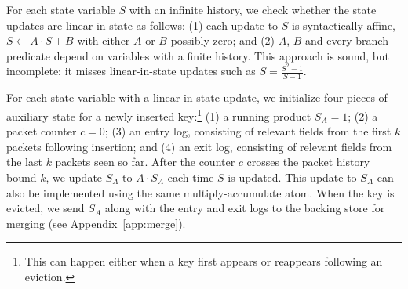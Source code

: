 %

 For each
state variable $S$ with an infinite history, we check whether the state updates
are linear-in-state as follows: (1) each update to $S$ is syntactically affine,
\ie $S \gets A \cdot S + B$ with either $A$ or $B$ possibly zero; and (2) $A$,
$B$ and every branch predicate depend on variables with a finite history. This
approach is sound, but incomplete: it misses linear-in-state updates such as $S
= \frac{S^2 - 1}{S - 1}$.

 For each state variable with a
linear-in-state update, we initialize four pieces of auxiliary state for a
newly inserted key:\footnote{This can happen either when a key first appears or
reappears following an eviction.} (1) a running product $S_A = 1$; (2) a packet
counter $c = 0$; (3) an entry log, consisting of relevant fields from the first
$k$ packets following insertion; and (4) an exit log, consisting of relevant
fields from the last $k$ packets seen so far.  After the counter $c$ crosses
the packet history bound $k$, we update $S_A$ to $A \cdot S_A$ each time $S$ is
updated. This update to $S_A$ can also be implemented using the same
multiply-accumulate atom. When the key is evicted, we send $S_A$ along with the
entry and exit logs to the backing store for merging (see
Appendix~\ref{app:merge}).
